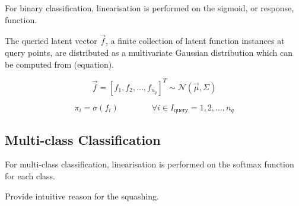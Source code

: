 			For binary classification, linearisation is performed on the sigmoid, or response, function.
		
			The queried latent vector $\vec{f}$, a finite collection of latent function instances at query points, are distributed as a multivariate Gaussian distribution which can be computed from (equation). 
			
			\begin{equation}
				\vec{f} = [f_{1}, f_{2}, \dots, f_{n_{q}}]^{T} \sim \mathcal{N}(\vec{\mu}, \Sigma)
			\end{equation}
				
			\begin{equation}
				\pi_{i} = \sigma(f_{i}) \qquad \qquad \forall i \in I_{\mathrm{query}} = {1, 2, \dots, n_{q}}
			\end{equation}
			
		\subsection{Multi-class Classification}
		
			For multi-class classification, linearisation is performed on the softmax function for each class.
			
			Provide intuitive reason for the squashing.
			
		